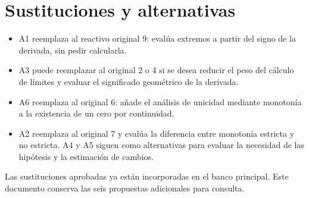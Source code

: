 \documentclass[10pt]{article}
\begin{document}
\section*{Sustituciones y alternativas}
\begin{itemize}
\item A1 reemplaza al reactivo original 9: evalúa extremos a
partir del signo de la derivada, sin pedir calcularla.
\item A3 puede reemplazar al original 2 o 4 si se desea reducir el peso
del cálculo de límites y evaluar el significado geométrico de la derivada.
\item A6 reemplaza al original 6: añade el análisis de unicidad
mediante monotonía a la existencia de un cero por continuidad.
\item A2 reemplaza al original 7 y evalúa la diferencia entre monotonía
estricta y no estricta. A4 y A5 siguen como alternativas para evaluar
la necesidad de las hipótesis y la estimación de cambios.
\end{itemize}
Las sustituciones aprobadas ya están incorporadas en el banco principal.
Este documento conserva las seis propuestas adicionales para consulta.
\end{document}
